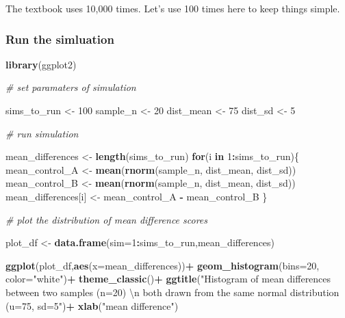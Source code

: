 \documentclass[]{book}
\newenvironment{Shaded}{\begin{snugshade}}{\end{snugshade}}
\newcommand{\KeywordTok}[1]{\textcolor[rgb]{0.13,0.29,0.53}{\textbf{#1}}}
\newcommand{\DataTypeTok}[1]{\textcolor[rgb]{0.13,0.29,0.53}{#1}}
\newcommand{\DecValTok}[1]{\textcolor[rgb]{0.00,0.00,0.81}{#1}}
\newcommand{\CharTok}[1]{\textcolor[rgb]{0.31,0.60,0.02}{#1}}
\newcommand{\StringTok}[1]{\textcolor[rgb]{0.31,0.60,0.02}{#1}}
\newcommand{\CommentTok}[1]{\textcolor[rgb]{0.56,0.35,0.01}{\textit{#1}}}
\newcommand{\ControlFlowTok}[1]{\textcolor[rgb]{0.13,0.29,0.53}{\textbf{#1}}}
\newcommand{\OperatorTok}[1]{\textcolor[rgb]{0.81,0.36,0.00}{\textbf{#1}}}
\newcommand{\NormalTok}[1]{#1}
\begin{document}
The textbook uses 10,000 times. Let's use 100 times here to keep things
simple.

\subsubsection{Run the simluation}\label{run-the-simluation}

\begin{Shaded}
\begin{Highlighting}[]
\KeywordTok{library}\NormalTok{(ggplot2)}

\CommentTok{# set paramaters of simulation}

\NormalTok{sims_to_run <-}\StringTok{ }\DecValTok{100}
\NormalTok{sample_n   <-}\StringTok{ }\DecValTok{20}
\NormalTok{dist_mean  <-}\StringTok{ }\DecValTok{75}
\NormalTok{dist_sd    <-}\StringTok{ }\DecValTok{5}

\CommentTok{# run simulation}

\NormalTok{mean_differences <-}\StringTok{ }\KeywordTok{length}\NormalTok{(sims_to_run)}
\ControlFlowTok{for}\NormalTok{(i }\ControlFlowTok{in} \DecValTok{1}\OperatorTok{:}\NormalTok{sims_to_run)\{}
\NormalTok{  mean_control_A      <-}\StringTok{ }\KeywordTok{mean}\NormalTok{(}\KeywordTok{rnorm}\NormalTok{(sample_n, dist_mean, dist_sd))}
\NormalTok{  mean_control_B      <-}\StringTok{ }\KeywordTok{mean}\NormalTok{(}\KeywordTok{rnorm}\NormalTok{(sample_n, dist_mean, dist_sd))}
\NormalTok{  mean_differences[i] <-}\StringTok{ }\NormalTok{mean_control_A }\OperatorTok{-}\StringTok{ }\NormalTok{mean_control_B}
\NormalTok{\}}

\CommentTok{# plot the  distribution of mean difference scores}

\NormalTok{plot_df <-}\StringTok{ }\KeywordTok{data.frame}\NormalTok{(}\DataTypeTok{sim=}\DecValTok{1}\OperatorTok{:}\NormalTok{sims_to_run,mean_differences)}

\KeywordTok{ggplot}\NormalTok{(plot_df,}\KeywordTok{aes}\NormalTok{(}\DataTypeTok{x=}\NormalTok{mean_differences))}\OperatorTok{+}
\StringTok{  }\KeywordTok{geom_histogram}\NormalTok{(}\DataTypeTok{bins=}\DecValTok{20}\NormalTok{, }\DataTypeTok{color=}\StringTok{"white"}\NormalTok{)}\OperatorTok{+}
\StringTok{  }\KeywordTok{theme_classic}\NormalTok{()}\OperatorTok{+}
\StringTok{  }\KeywordTok{ggtitle}\NormalTok{(}\StringTok{"Histogram of mean differences between two samples (n=20) }\CharTok{\textbackslash{}n}
\StringTok{          both drawn from the same normal distribution (u=75, sd=5"}\NormalTok{)}\OperatorTok{+}
\StringTok{  }\KeywordTok{xlab}\NormalTok{(}\StringTok{"mean difference"}\NormalTok{)}
\end{Highlighting}
\end{Shaded}
\end{document}
